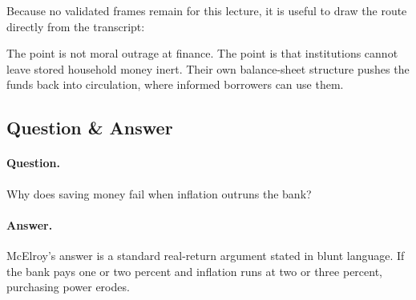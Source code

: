 Because no validated frames remain for this lecture, it is useful to draw the route directly from the transcript:

\begin{figure}[h]
\centering
{}
\end{figure}

The point is not moral outrage at finance. The point is that institutions cannot leave stored household money inert. Their own balance-sheet structure pushes the funds back into circulation, where informed borrowers can use them.

\subsection{Question \& Answer}

\paragraph{Question.} Why does saving money fail when inflation outruns the bank?

\paragraph{Answer.} McElroy's answer is a standard real-return argument stated in blunt language. If the bank pays one or two percent and inflation runs at two or three percent, purchasing power erodes.

